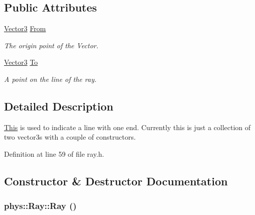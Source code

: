 \subsection*{Public Attributes}
\begin{DoxyCompactItemize}
\item 
\hypertarget{classphys_1_1Ray_a3004d52f8f1e317ee602f8f278531057}{
\hyperlink{classphys_1_1Vector3}{Vector3} \hyperlink{classphys_1_1Ray_a3004d52f8f1e317ee602f8f278531057}{From}}
\label{df/d57/classphys_1_1Ray_a3004d52f8f1e317ee602f8f278531057}

\begin{DoxyCompactList}\small\item\em The origin point of the Vector. \item\end{DoxyCompactList}\item 
\hypertarget{classphys_1_1Ray_aa2585a1c6d29d1533c816e7277baf1ad}{
\hyperlink{classphys_1_1Vector3}{Vector3} \hyperlink{classphys_1_1Ray_aa2585a1c6d29d1533c816e7277baf1ad}{To}}
\label{df/d57/classphys_1_1Ray_aa2585a1c6d29d1533c816e7277baf1ad}

\begin{DoxyCompactList}\small\item\em A point on the line of the ray. \item\end{DoxyCompactList}\end{DoxyCompactItemize}


\subsection{Detailed Description}
\hyperlink{structThis}{This} is used to indicate a line with one end. Currently this is just a collection of two vector3s with a couple of constructors. 

Definition at line 59 of file ray.h.



\subsection{Constructor \& Destructor Documentation}
\hypertarget{classphys_1_1Ray_a35f4f5eec653ea561353163eaad672d3}{
\subsubsection[{Ray}]{\setlength{\rightskip}{0pt plus 5cm}phys::Ray::Ray ()}}
\label{df/d57/classphys_1_1Ray_a35f4f5eec653ea561353163eaad672d3}


